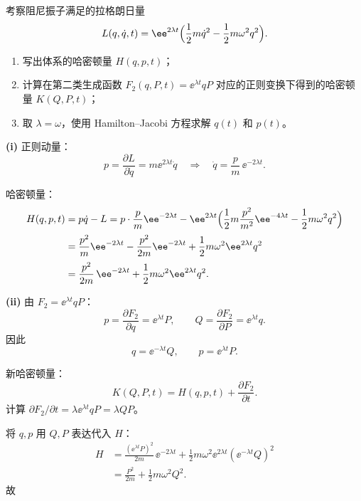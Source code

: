 \begin{question}[阻尼振子]
考察阻尼振子满足的拉格朗日量
\[
L(q,\dot q,t)=\ee^{2\lambda t}
\Bigl(\frac12 m\dot q^{2}-\frac12 m\omega^{2}q^{2}\Bigr).
\]

\begin{enumerate}[label=(\roman*)]
  \item 写出体系的哈密顿量 $H(q,p,t)$；
  \item 计算在第二类生成函数 $F_{2}(q,P,t)=\ee^{\lambda t}qP$ 对应的正则变换下得到的哈密顿量 $K(Q,P,t)$；
  \item 取 $\lambda=\omega$，使用 Hamilton--Jacobi 方程求解 $q(t)$ 和 $p(t)$。
\end{enumerate}

\begin{solution}

\textbf{(i)} 正则动量：
\[
p=\frac{\partial L}{\partial\dot q}=m\ee^{2\lambda t}\dot q
\quad\Longrightarrow\quad
\dot q=\frac{p}{m}\,\ee^{-2\lambda t}.
\]

哈密顿量：
\begin{align*}
H(q,p,t)&=p\dot q-L
=p\cdot\frac{p}{m}\ee^{-2\lambda t}
-\ee^{2\lambda t}\Bigl(\frac12 m\frac{p^{2}}{m^{2}}\ee^{-4\lambda t}
-\frac12 m\omega^{2}q^{2}\Bigr) \\[2pt]
&=\frac{p^{2}}{m}\ee^{-2\lambda t}
-\frac{p^{2}}{2m}\ee^{-2\lambda t}
+\frac12 m\omega^{2}\ee^{2\lambda t}q^{2} \\[2pt]
&=\frac{p^{2}}{2m}\,\ee^{-2\lambda t}
+\frac12 m\omega^{2}\ee^{2\lambda t}q^{2}.
\end{align*}

\textbf{(ii)} 由 $F_{2}=\ee^{\lambda t}qP$：
\[
p=\frac{\partial F_{2}}{\partial q}=\ee^{\lambda t}P,\qquad
Q=\frac{\partial F_{2}}{\partial P}=\ee^{\lambda t}q.
\]
因此
\[
q=\ee^{-\lambda t}Q,\qquad p=\ee^{\lambda t}P.
\]

新哈密顿量：
\[
K(Q,P,t)=H(q,p,t)+\frac{\partial F_{2}}{\partial t}.
\]
计算 $\partial F_{2}/\partial t=\lambda\ee^{\lambda t}qP=\lambda QP$。

将 $q,p$ 用 $Q,P$ 表达代入 $H$：
\begin{align*}
H&=\frac{(\ee^{\lambda t}P)^{2}}{2m}\,\ee^{-2\lambda t}
+\frac12 m\omega^{2}\ee^{2\lambda t}(\ee^{-\lambda t}Q)^{2} \\[2pt]
&=\frac{P^{2}}{2m}+\frac12 m\omega^{2}Q^{2}.
\end{align*}
故



\end{solution}
\end{question}
